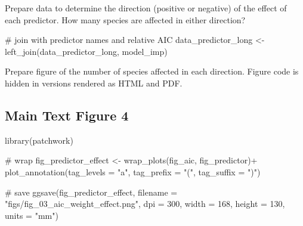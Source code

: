 \documentclass[]{article}
\newenvironment{Shaded}{}{}
\newcommand{\CommentTok}[1]{\textcolor[rgb]{0.00,0.50,0.00}{#1}}
\newcommand{\DataTypeTok}[1]{#1}
\newcommand{\DecValTok}[1]{#1}
\newcommand{\KeywordTok}[1]{\textcolor[rgb]{0.00,0.00,1.00}{#1}}
\newcommand{\NormalTok}[1]{#1}
\newcommand{\OperatorTok}[1]{#1}
\newcommand{\StringTok}[1]{\textcolor[rgb]{0.00,0.50,0.50}{#1}}
\begin{document}
Prepare data to determine the direction (positive or negative) of the effect of each predictor. How many species are affected in either direction?

\begin{Shaded}
\begin{Highlighting}[]
\CommentTok{# join with predictor names and relative AIC}
\NormalTok{data_predictor_long <-}\StringTok{ }\KeywordTok{left_join}\NormalTok{(data_predictor_long, model_imp)}
\end{Highlighting}
\end{Shaded}

Prepare figure of the number of species affected in each direction. Figure code is hidden in versions rendered as HTML and PDF.

\hypertarget{main-text-figure-4}{%
\subsection{Main Text Figure 4}\label{main-text-figure-4}}

\begin{Shaded}
\begin{Highlighting}[]
\KeywordTok{library}\NormalTok{(patchwork)}

\CommentTok{# wrap}
\NormalTok{fig_predictor_effect <-}\StringTok{ }
\StringTok{  }\KeywordTok{wrap_plots}\NormalTok{(fig_aic, fig_predictor)}\OperatorTok{+}
\StringTok{  }\KeywordTok{plot_annotation}\NormalTok{(}\DataTypeTok{tag_levels =} \StringTok{"a"}\NormalTok{,}
                  \DataTypeTok{tag_prefix =} \StringTok{"("}\NormalTok{,}
                  \DataTypeTok{tag_suffix =} \StringTok{")"}\NormalTok{)}

\CommentTok{# save}
\KeywordTok{ggsave}\NormalTok{(fig_predictor_effect,}
       \DataTypeTok{filename =} \StringTok{"figs/fig_03_aic_weight_effect.png"}\NormalTok{,}
       \DataTypeTok{dpi =} \DecValTok{300}\NormalTok{,}
       \DataTypeTok{width =} \DecValTok{168}\NormalTok{, }\DataTypeTok{height =} \DecValTok{130}\NormalTok{, }\DataTypeTok{units =} \StringTok{"mm"}\NormalTok{)}
\end{Highlighting}
\end{Shaded}
\end{document}
